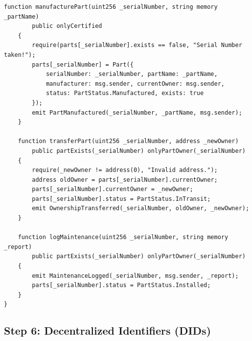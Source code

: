 \documentclass[12pt,a4paper]{article}
\begin{document}
\begin{lstlisting}[caption={Step5\_Enhancement.sol -- Adds certification system}]
    function manufacturePart(uint256 _serialNumber, string memory _partName)
        public onlyCertified
    {
        require(parts[_serialNumber].exists == false, "Serial Number taken!");
        parts[_serialNumber] = Part({
            serialNumber: _serialNumber, partName: _partName,
            manufacturer: msg.sender, currentOwner: msg.sender,
            status: PartStatus.Manufactured, exists: true
        });
        emit PartManufactured(_serialNumber, _partName, msg.sender);
    }

    function transferPart(uint256 _serialNumber, address _newOwner)
        public partExists(_serialNumber) onlyPartOwner(_serialNumber)
    {
        require(_newOwner != address(0), "Invalid address.");
        address oldOwner = parts[_serialNumber].currentOwner;
        parts[_serialNumber].currentOwner = _newOwner;
        parts[_serialNumber].status = PartStatus.InTransit;
        emit OwnershipTransferred(_serialNumber, oldOwner, _newOwner);
    }

    function logMaintenance(uint256 _serialNumber, string memory _report)
        public partExists(_serialNumber) onlyPartOwner(_serialNumber)
    {
        emit MaintenanceLogged(_serialNumber, msg.sender, _report);
        parts[_serialNumber].status = PartStatus.Installed;
    }
}
\end{lstlisting}

\subsection{Step 6: Decentralized Identifiers (DIDs)}
\end{document}
